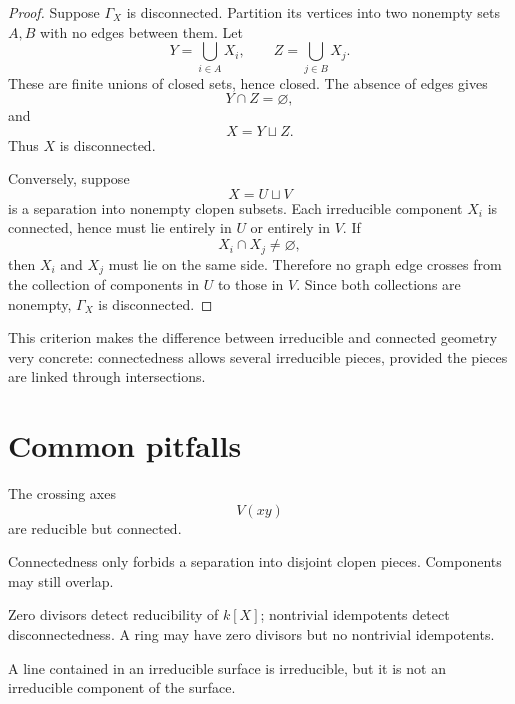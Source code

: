 \begin{proof}
Suppose \(\Gamma_X\) is disconnected.  Partition its vertices into two nonempty sets
\(A,B\) with no edges between them.  Let
\[
Y=\bigcup_{i\in A}X_i,
\qquad
Z=\bigcup_{j\in B}X_j.
\]
These are finite unions of closed sets, hence closed.  The absence of edges gives
\[
Y\cap Z=\varnothing,
\]
and
\[
X=Y\sqcup Z.
\]
Thus \(X\) is disconnected.

Conversely, suppose
\[
X=U\sqcup V
\]
is a separation into nonempty clopen subsets.  Each irreducible component \(X_i\) is
connected, hence must lie entirely in \(U\) or entirely in \(V\).  If
\[
X_i\cap X_j\neq\varnothing,
\]
then \(X_i\) and \(X_j\) must lie on the same side.  Therefore no graph edge crosses from
the collection of components in \(U\) to those in \(V\).  Since both collections are
nonempty, \(\Gamma_X\) is disconnected.
\end{proof}

This criterion makes the difference between irreducible and connected geometry very
concrete: connectedness allows several irreducible pieces, provided the pieces are linked
through intersections.



\section{Common pitfalls}

\begin{warning}
The crossing axes
\[
V(xy)
\]
are reducible but connected.
\end{warning}

\begin{warning}
Connectedness only forbids a separation into disjoint clopen pieces.  Components may still
overlap.
\end{warning}

\begin{warning}
Zero divisors detect reducibility of \(k[X]\); nontrivial idempotents detect
disconnectedness.  A ring may have zero divisors but no nontrivial idempotents.
\end{warning}

\begin{warning}
A line contained in an irreducible surface is irreducible, but it is not an irreducible
component of the surface.
\end{warning}

